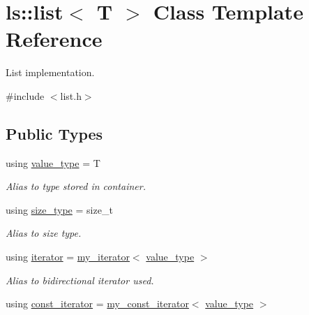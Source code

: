 \hypertarget{classls_1_1list}{}\section{ls\+:\+:list$<$ T $>$ Class Template Reference}
\label{classls_1_1list}


List implementation.  




{\ttfamily \#include $<$list.\+h$>$}

\subsection*{Public Types}
\begin{DoxyCompactItemize}
\item 
\mbox{\label{classls_1_1list_a71c7a4d7061c0c3f23aba13232eda0f6}} 
using \hyperlink{classls_1_1list_a71c7a4d7061c0c3f23aba13232eda0f6}{value\+\_\+type} = T
\begin{DoxyCompactList}\small\item\em Alias to type stored in container. \end{DoxyCompactList}\item 
\mbox{\label{classls_1_1list_a91bb77719712ad6127f0bdf97ed5bd64}} 
using \hyperlink{classls_1_1list_a91bb77719712ad6127f0bdf97ed5bd64}{size\+\_\+type} = size\+\_\+t
\begin{DoxyCompactList}\small\item\em Alias to size type. \end{DoxyCompactList}\item 
\mbox{\label{classls_1_1list_af036cf72da26107a5084c1e4b45b9cb7}} 
using \hyperlink{classls_1_1list_af036cf72da26107a5084c1e4b45b9cb7}{iterator} = \hyperlink{classls_1_1my__iterator}{my\+\_\+iterator}$<$ \hyperlink{classls_1_1list_a71c7a4d7061c0c3f23aba13232eda0f6}{value\+\_\+type} $>$
\begin{DoxyCompactList}\small\item\em Alias to bidirectional iterator used. \end{DoxyCompactList}\item 
\mbox{\label{classls_1_1list_ad543276e86075caadf97ae64f2fc7cfc}} 
using \hyperlink{classls_1_1list_ad543276e86075caadf97ae64f2fc7cfc}{const\+\_\+iterator} = \hyperlink{classls_1_1my__const__iterator}{my\+\_\+const\+\_\+iterator}$<$ \hyperlink{classls_1_1list_a71c7a4d7061c0c3f23aba13232eda0f6}{value\+\_\+type} $>$

\end{DoxyCompactItemize}
